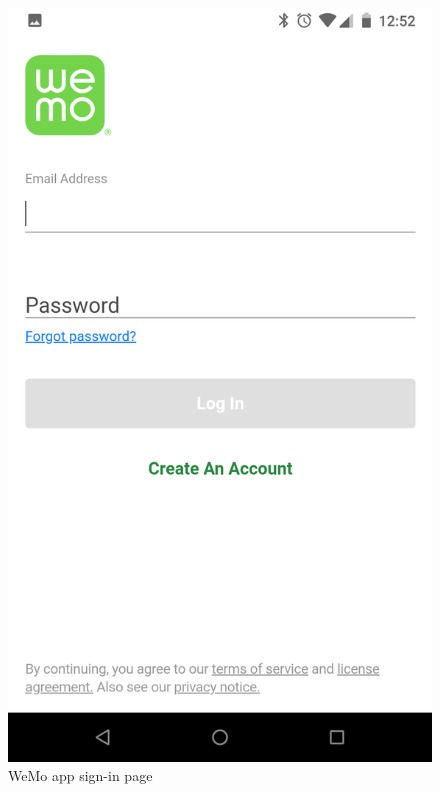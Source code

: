 \begin{figure}[H]
\centering
\includegraphics[scale=0.09]{figs/wemoApp/signInWemo.png}
\caption{WeMo app sign-in page}
\label{fig:signInWemo}
\end{figure}

